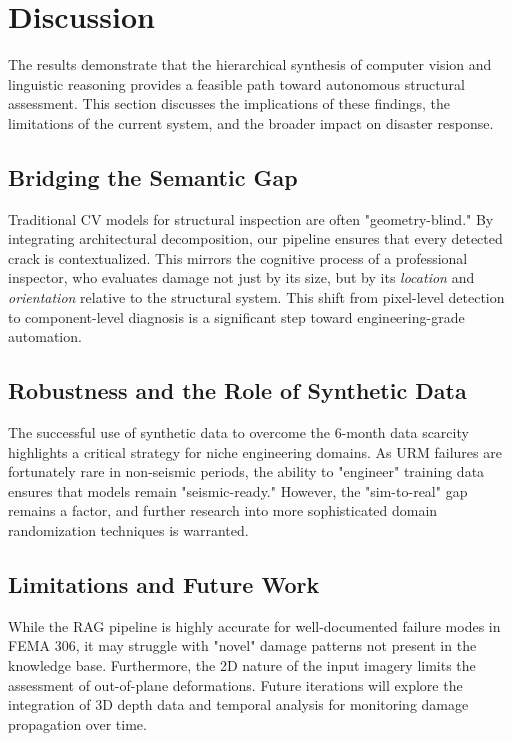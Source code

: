 \section{Discussion}
\label{sec:discussion}

\begin{sloppypar}
The results demonstrate that the hierarchical synthesis of computer vision and linguistic reasoning provides a feasible path toward autonomous structural assessment. This section discusses the implications of these findings, the limitations of the current system, and the broader impact on disaster response.
\end{sloppypar}

\subsection{Bridging the Semantic Gap}
\begin{sloppypar}
Traditional CV models for structural inspection are often "geometry-blind." By integrating architectural decomposition, our pipeline ensures that every detected crack is contextualized. This mirrors the cognitive process of a professional inspector, who evaluates damage not just by its size, but by its \textit{location} and \textit{orientation} relative to the structural system. This shift from pixel-level detection to component-level diagnosis is a significant step toward engineering-grade automation.
\end{sloppypar}

\subsection{Robustness and the Role of Synthetic Data}
\begin{sloppypar}
The successful use of synthetic data to overcome the 6-month data scarcity highlights a critical strategy for niche engineering domains. As URM failures are fortunately rare in non-seismic periods, the ability to "engineer" training data ensures that models remain "seismic-ready." However, the "sim-to-real" gap remains a factor, and further research into more sophisticated domain randomization techniques is warranted.
\end{sloppypar}

\subsection{Limitations and Future Work}
\begin{sloppypar}
While the RAG pipeline is highly accurate for well-documented failure modes in FEMA 306, it may struggle with "novel" damage patterns not present in the knowledge base. Furthermore, the 2D nature of the input imagery limits the assessment of out-of-plane deformations. Future iterations will explore the integration of 3D depth data and temporal analysis for monitoring damage propagation over time.
\end{sloppypar}
